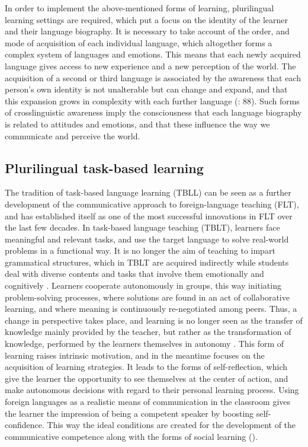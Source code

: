 \documentclass[output=paper]{../langscibook}
\begin{document}
In order to implement the above-mentioned forms of learning, plurilingual learning settings are required, which put a focus on the identity of the learner and their language biography. It is necessary to take account of the order, and mode of acquisition of each individual language, which altogether forms a complex system of languages and emotions. This means that each newly acquired language gives access to new experience and a new perception of the world. The acquisition of a second or third language is associated by the awareness that each person’s own identity is not unalterable but can change and expand, and that this expansion grows in complexity with each further language (\citealt{ReichKrumm2013}: 88). Such forms of crosslinguistic awareness imply the consciousness that each language biography is related to attitudes and emotions, and that these influence the way we communicate and perceive the world.

\subsection{Plurilingual task-based learning}

The tradition of task-based language learning (TBLL) can be seen as a further development of the communicative approach to foreign-language teaching (FLT), and has established itself as one of the most successful innovations in FLT over the last few decades. In task-based language teaching (TBLT), learners face meaningful and relevant tasks, and use the target language to solve real-world problems in a functional way. It is no longer the aim of teaching to impart grammatical structures, which in TBLT are acquired indirectly while students deal with diverse contents and tasks that involve them emotionally and cognitively \citep{Hallet2012}. Learners cooperate autonomously in groups, this way initiating problem-solving processes, where solutions are found in an act of collaborative learning, and where meaning is continuously re-negotiated among peers. Thus, a change in perspective takes place, and learning is no longer seen as the transfer of knowledge mainly provided by the teacher, but rather as the transformation of knowledge, performed by the learners themselves in autonomy \citep{Ellis2003}. This form of learning raises intrinsic motivation, and in the meantime focuses on the acquisition of learning strategies. It leads to the forms of self-reflection, which give the learner the opportunity to see themselves at the center of action, and make autonomous decisions with regard to their personal learning process. Using foreign languages as a realistic means of communication in the classroom gives the learner the impression of being a competent speaker by boosting self-confidence. This way the ideal conditions are created for the development of the communicative competence along with the forms of social learning (\citealt[84f]{Dewaele2010}). 
\end{document}
